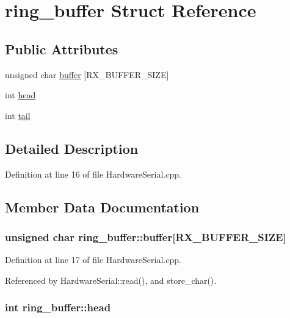 \hypertarget{structring__buffer}{
\section{ring\_\-buffer Struct Reference}
\label{structring__buffer}
}
\subsection*{Public Attributes}
\begin{DoxyCompactItemize}
\item 
unsigned char \hyperlink{structring__buffer_a11b70d4a150ea9750e4102706d6ee0b8}{buffer} \mbox{[}RX\_\-BUFFER\_\-SIZE\mbox{]}
\item 
int \hyperlink{structring__buffer_ac1b620f2e27c3af75e68bd1645a2f5f0}{head}
\item 
int \hyperlink{structring__buffer_a4d06965736f37f64f15bbd0ca9457771}{tail}
\end{DoxyCompactItemize}


\subsection{Detailed Description}


Definition at line 16 of file HardwareSerial.cpp.



\subsection{Member Data Documentation}
\hypertarget{structring__buffer_a11b70d4a150ea9750e4102706d6ee0b8}{
\subsubsection[{buffer}]{\setlength{\rightskip}{0pt plus 5cm}unsigned char {\bf ring\_\-buffer::buffer}\mbox{[}RX\_\-BUFFER\_\-SIZE\mbox{]}}}
\label{structring__buffer_a11b70d4a150ea9750e4102706d6ee0b8}


Definition at line 17 of file HardwareSerial.cpp.



Referenced by HardwareSerial::read(), and store\_\-char().

\hypertarget{structring__buffer_ac1b620f2e27c3af75e68bd1645a2f5f0}{
\subsubsection[{head}]{\setlength{\rightskip}{0pt plus 5cm}int {\bf ring\_\-buffer::head}}}
\label{structring__buffer_ac1b620f2e27c3af75e68bd1645a2f5f0}


